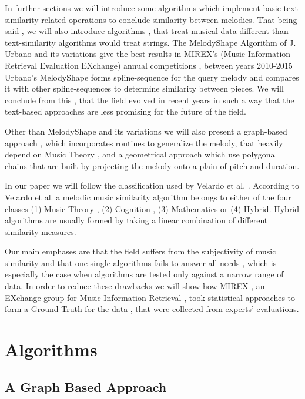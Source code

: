\documentclass{llncs}
\begin{document}
		In further sections we will introduce some algorithms which implement basic text-similarity related operations to conclude similarity between melodies. That being said , we will also introduce  algorithms , that treat musical data different than text-similarity algorithms would treat  strings. The MelodyShape Algorithm of J. Urbano \cite{five_point_two}  and its variations give the best results in MIREX's (Music Information Retrieval Evaluation EXchange) annual competitions , between years 2010-2015
		Urbano's MelodyShape forms spline-sequence for the query melody and compares it with other spline-sequences to determine similarity between pieces. We will conclude from this , that the field evolved in recent years in such a way that the text-based approaches are less promising for the future of the field.

		Other than MelodyShape and its variations we will also present a graph-based approach \cite{two_point_four} , which incorporates routines to generalize the melody, that heavily depend on Music Theory , and a geometrical approach which use polygonal chains that are built by projecting the melody onto a plain of pitch and duration.

		In our paper we will follow the classification used by Velardo et al. \cite{two}. According to Velardo et al. a melodic music similarity algorithm belongs to either of the four classes (1) Music Theory , (2) Cognition , (3) Mathematics or (4) Hybrid. Hybrid algorithms are usually formed by taking a linear combination of different similarity measures. 

		Our main emphases are that the field suffers from the subjectivity of music similarity and that one single algorithms fails to answer all needs , which is especially the case when algorithms are tested only against a narrow range of data. In order to reduce these drawbacks we will show how MIREX , an EXchange group for Music Information Retrieval , took statistical approaches to form a Ground Truth for the data , that were collected from experts' evaluations. 
	
	\section{Algorithms}

		\subsection{A Graph Based Approach}
\end{document}
